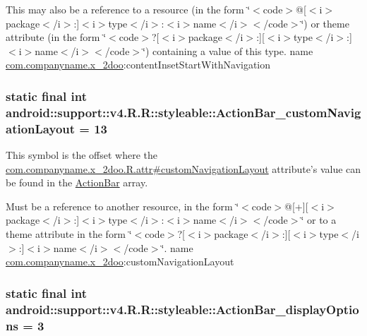 This may also be a reference to a resource (in the form \char`\"{}$<$code$>$@\mbox{[}$<$i$>$package$<$/i$>$:\mbox{]}$<$i$>$type$<$/i$>$:$<$i$>$name$<$/i$>$$<$/code$>$\char`\"{}) or theme attribute (in the form \char`\"{}$<$code$>$?\mbox{[}$<$i$>$package$<$/i$>$:\mbox{]}\mbox{[}$<$i$>$type$<$/i$>$:\mbox{]}$<$i$>$name$<$/i$>$$<$/code$>$\char`\"{}) containing a value of this type.  name \hyperlink{namespacecom_1_1companyname_1_1x__2doo}{com.companyname.x\_\-2doo}:contentInsetStartWithNavigation \hypertarget{classandroid_1_1support_1_1v4_1_1_r_1_1styleable_f3b2158180d9362405027a8913901587}{
\subsubsection[{ActionBar\_\-customNavigationLayout}]{\setlength{\rightskip}{0pt plus 5cm}static final int android::support::v4.R.R::styleable::ActionBar\_\-customNavigationLayout = 13}}
\label{classandroid_1_1support_1_1v4_1_1_r_1_1styleable_f3b2158180d9362405027a8913901587}


This symbol is the offset where the \hyperlink{classcom_1_1companyname_1_1x__2doo_1_1_r_1_1attr_0140b6fc19536cc50e92405e2ff1636b}{com.companyname.x\_\-2doo.R.attr\#customNavigationLayout} attribute's value can be found in the \hyperlink{classandroid_1_1support_1_1v4_1_1_r_1_1styleable_5c6cf2c83551ebae05f365bb913fdddf}{ActionBar} array.

Must be a reference to another resource, in the form \char`\"{}$<$code$>$@\mbox{[}+\mbox{]}\mbox{[}$<$i$>$package$<$/i$>$:\mbox{]}$<$i$>$type$<$/i$>$:$<$i$>$name$<$/i$>$$<$/code$>$\char`\"{} or to a theme attribute in the form \char`\"{}$<$code$>$?\mbox{[}$<$i$>$package$<$/i$>$:\mbox{]}\mbox{[}$<$i$>$type$<$/i$>$:\mbox{]}$<$i$>$name$<$/i$>$$<$/code$>$\char`\"{}.  name \hyperlink{namespacecom_1_1companyname_1_1x__2doo}{com.companyname.x\_\-2doo}:customNavigationLayout \hypertarget{classandroid_1_1support_1_1v4_1_1_r_1_1styleable_60b6f63f434384dc991ae78a8335cef3}{
\subsubsection[{ActionBar\_\-displayOptions}]{\setlength{\rightskip}{0pt plus 5cm}static final int android::support::v4.R.R::styleable::ActionBar\_\-displayOptions = 3}}
\label{classandroid_1_1support_1_1v4_1_1_r_1_1styleable_60b6f63f434384dc991ae78a8335cef3}


